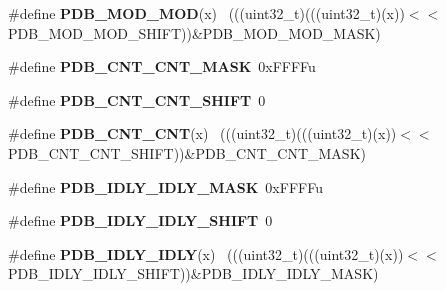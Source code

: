 \begin{DoxyCompactItemize}
\item 
\hypertarget{group___p_d_b___register___masks_ga8c8f8dd2b40994da70b3ed8edec15bb0}{}\#define {\bfseries P\+D\+B\+\_\+\+M\+O\+D\+\_\+\+M\+O\+D}(x)                                                  ~(((uint32\+\_\+t)(((uint32\+\_\+t)(x))$<$$<$P\+D\+B\+\_\+\+M\+O\+D\+\_\+\+M\+O\+D\+\_\+\+S\+H\+I\+F\+T))\&P\+D\+B\+\_\+\+M\+O\+D\+\_\+\+M\+O\+D\+\_\+\+M\+A\+S\+K)\label{group___p_d_b___register___masks_ga8c8f8dd2b40994da70b3ed8edec15bb0}

\item 
\hypertarget{group___p_d_b___register___masks_ga2c5797892b612935a1eb7ba29ea0d202}{}\#define {\bfseries P\+D\+B\+\_\+\+C\+N\+T\+\_\+\+C\+N\+T\+\_\+\+M\+A\+S\+K}~0x\+F\+F\+F\+Fu\label{group___p_d_b___register___masks_ga2c5797892b612935a1eb7ba29ea0d202}

\item 
\hypertarget{group___p_d_b___register___masks_ga684fc86038c1a05d2ba14aa872e551a6}{}\#define {\bfseries P\+D\+B\+\_\+\+C\+N\+T\+\_\+\+C\+N\+T\+\_\+\+S\+H\+I\+F\+T}~0\label{group___p_d_b___register___masks_ga684fc86038c1a05d2ba14aa872e551a6}

\item 
\hypertarget{group___p_d_b___register___masks_gaba80630566123d5cf67862a5b024af87}{}\#define {\bfseries P\+D\+B\+\_\+\+C\+N\+T\+\_\+\+C\+N\+T}(x)                                                  ~(((uint32\+\_\+t)(((uint32\+\_\+t)(x))$<$$<$P\+D\+B\+\_\+\+C\+N\+T\+\_\+\+C\+N\+T\+\_\+\+S\+H\+I\+F\+T))\&P\+D\+B\+\_\+\+C\+N\+T\+\_\+\+C\+N\+T\+\_\+\+M\+A\+S\+K)\label{group___p_d_b___register___masks_gaba80630566123d5cf67862a5b024af87}

\item 
\hypertarget{group___p_d_b___register___masks_gaa3a9995da0b93a73827d556de3a7f8ec}{}\#define {\bfseries P\+D\+B\+\_\+\+I\+D\+L\+Y\+\_\+\+I\+D\+L\+Y\+\_\+\+M\+A\+S\+K}~0x\+F\+F\+F\+Fu\label{group___p_d_b___register___masks_gaa3a9995da0b93a73827d556de3a7f8ec}

\item 
\hypertarget{group___p_d_b___register___masks_ga7ce7e734267097f79a8fd2036dc25271}{}\#define {\bfseries P\+D\+B\+\_\+\+I\+D\+L\+Y\+\_\+\+I\+D\+L\+Y\+\_\+\+S\+H\+I\+F\+T}~0\label{group___p_d_b___register___masks_ga7ce7e734267097f79a8fd2036dc25271}

\item 
\hypertarget{group___p_d_b___register___masks_ga07fbca50ea650a4ca32f51bf89ff3732}{}\#define {\bfseries P\+D\+B\+\_\+\+I\+D\+L\+Y\+\_\+\+I\+D\+L\+Y}(x)                                              ~(((uint32\+\_\+t)(((uint32\+\_\+t)(x))$<$$<$P\+D\+B\+\_\+\+I\+D\+L\+Y\+\_\+\+I\+D\+L\+Y\+\_\+\+S\+H\+I\+F\+T))\&P\+D\+B\+\_\+\+I\+D\+L\+Y\+\_\+\+I\+D\+L\+Y\+\_\+\+M\+A\+S\+K)\label{group___p_d_b___register___masks_ga07fbca50ea650a4ca32f51bf89ff3732}


\end{DoxyCompactItemize}
